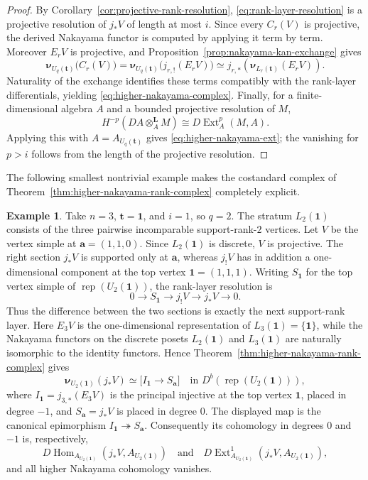 \documentclass[12pt,reqno]{amsart}
\theoremstyle{definition}
\newtheorem{example}[theorem]{Example}
\theoremstyle{remark}
\newcommand{\Rep}{\operatorname{rep}}
\newcommand{\Hom}{\operatorname{Hom}}
\newcommand{\Ext}{\operatorname{Ext}}
\begin{document}
\begin{proof}
By Corollary~\ref{cor:projective-rank-resolution},
\eqref{eq:rank-layer-resolution} is a projective resolution of $j_*V$ of
length at most $i$.  Since every $C_r(V)$ is projective, the derived Nakayama
functor is computed by applying it term by term.  Moreover $E_rV$ is
projective, and Proposition~\ref{prop:nakayama-kan-exchange} gives
\[
\boldsymbol\nu_{U_q(\mathbf t)}\bigl(C_r(V)\bigr)
=
\boldsymbol\nu_{U_q(\mathbf t)}\bigl(j_{r,!}(E_rV)\bigr)
\simeq
j_{r,*}\!\left(\boldsymbol\nu_{L_r(\mathbf t)}(E_rV)\right).
\]
Naturality of the exchange identifies these terms compatibly with the
rank-layer differentials, yielding \eqref{eq:higher-nakayama-complex}.
Finally, for a finite-dimensional algebra $A$ and a bounded projective
resolution of $M$,
\[
H^{-p}(DA\otimes_A^{\mathbf L}M)
\cong
D\Ext_A^p(M,A).
\]
Applying this with $A=A_{U_q(\mathbf t)}$ gives
\eqref{eq:higher-nakayama-ext}; the vanishing for $p>i$ follows from the
length of the projective resolution.
\end{proof}

The following smallest nontrivial example makes the costandard complex of
Theorem~\ref{thm:higher-nakayama-rank-complex} completely explicit.

\begin{example}\label{ex:rank-layer-three}
Take $n=3$, $\mathbf t=\mathbf1$, and $i=1$, so $q=2$.  The stratum
$L_2(\mathbf1)$ consists of the three pairwise incomparable support-rank-$2$
vertices.  Let $V$ be the vertex simple at $\mathbf a=(1,1,0)$.  Since
$L_2(\mathbf1)$ is discrete, $V$ is projective.  The right section $j_*V$ is
supported only at $\mathbf a$, whereas $j_!V$ has in addition a
one-dimensional component at the top vertex $\mathbf1=(1,1,1)$.  Writing
$S_{\mathbf1}$ for the top vertex simple of $\Rep(U_2(\mathbf1))$, the
rank-layer resolution is
\[
0\longrightarrow S_{\mathbf1}\longrightarrow j_!V
\longrightarrow j_*V\longrightarrow0.
\]
Thus the difference between the two sections is exactly the next support-rank
layer.  Here $E_3V$ is the one-dimensional representation of
$L_3(\mathbf1)=\{\mathbf1\}$, while the Nakayama functors on the discrete
posets $L_2(\mathbf1)$ and $L_3(\mathbf1)$ are naturally isomorphic to the
identity functors.  Hence
Theorem~\ref{thm:higher-nakayama-rank-complex} gives
\[
\boldsymbol\nu_{U_2(\mathbf1)}(j_*V)
\simeq
\bigl[I_{\mathbf1}\longrightarrow S_{\mathbf a}\bigr]
\quad\text{in }D^b(\Rep(U_2(\mathbf1))),
\]
where $I_{\mathbf1}=j_{3,*}(E_3V)$ is the principal injective at the top
vertex $\mathbf1$, placed in degree $-1$, and $S_{\mathbf a}=j_*V$ is placed
in degree $0$.  The displayed map is the canonical epimorphism
$I_{\mathbf1}\twoheadrightarrow S_{\mathbf a}$.  Consequently its cohomology
in degrees $0$ and $-1$ is, respectively,
\[
D\Hom_{A_{U_2(\mathbf1)}}(j_*V,A_{U_2(\mathbf1)})
\quad\text{and}\quad
D\Ext^1_{A_{U_2(\mathbf1)}}(j_*V,A_{U_2(\mathbf1)}),
\]
and all higher Nakayama cohomology vanishes.
\end{example}
\end{document}
